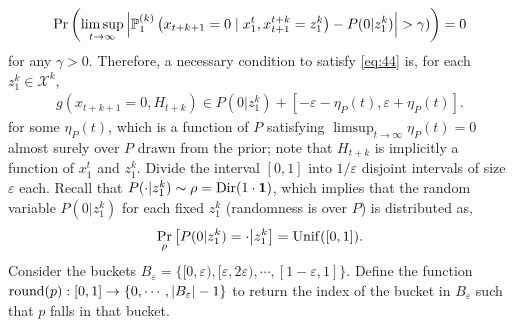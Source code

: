 \begin{align}
    \Pr \left( \limsup_{t \to \infty} \left|\mathbb{P}_{1}^{(k)}\left( x_{t+k+1} = 0 \mid x_1^t, x_{t+1}^{t+k} = z_1^k\right) - P(0 | z_1^k ) \right| > \gamma ) \right) = 0
\end{align}
for any $\gamma > 0$. Therefore, a necessary condition to satisfy \cref{eq:44} is, for each $z_1^k \in \mathcal{X}^k$,
\begin{align}
    g ( x_{t+k+1} = 0, H_{t+k} ) \in P(0|z_1^k) + [-\varepsilon-\eta_P (t),\varepsilon+\eta_P (t)].
\end{align}
for some $\eta_P (t)$, which is a function of $P$ satisfying $\limsup_{t \to \infty} \eta_P (t) = 0$ almost surely over $P$ drawn from the prior; note that $H_{t+k}$ is implicitly a function of $x_1^t$ and $z_1^k$. Divide the interval $[0,1]$ into $1/\varepsilon$ disjoint intervals of size $\varepsilon$ each.  Recall that $P (\cdot|z_1^k) \sim \rho = \mathrm{Dir}(1 \cdot \bm{1})$, which implies that the random variable $P (0|z_1^k)$ for each fixed $z_1^k$ (randomness is over $P$) is distributed as,
\begin{align}
    \Pr_\rho \left[ P (0|z_1^k) = \cdot \middle| z_1^k \right] = \mathrm{Unif}([0,1]).
\end{align}
Consider the buckets $B_{\varepsilon} = \{ [0,\varepsilon), [\varepsilon,2\varepsilon), \cdots, [1-\varepsilon,1]\}$. Define the function $\mathrm{round} (p) : [0,1] \to \{ 0,\cdots,|B_{\varepsilon}|-1 \}$ to return the index of the bucket in $B_\varepsilon$ such that $p$ falls in that bucket.


